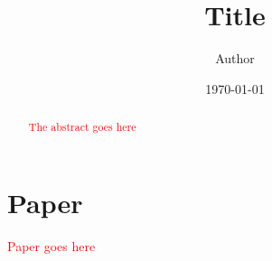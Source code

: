 \documentclass[12pt]{article}
\title{Title}
\author{
        Author \\
}
\date{\today}
\providecommand{\note}{\textcolor{red}} %
\begin{document}
\maketitle

\begin{abstract}
\note{The abstract goes here}
\end{abstract}

\section{Paper}
\note{Paper goes here}
\end{document}

